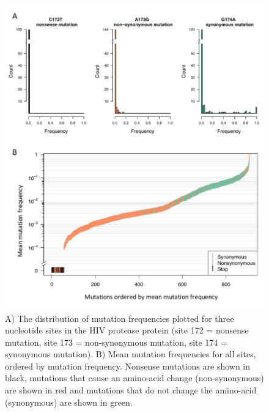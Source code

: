 \documentclass{article}
\begin{document}
\begin{figure}[ht!]
\centering
\includegraphics[scale = .8]{F1-grouped.pdf}
\caption{A) The distribution of mutation frequencies plotted for three nucleotide sites in the HIV protease protein (site 172 = nonsense mutation,  site 173 = non-synonymous mutation, site 174 = synonymous mutation). B) Mean mutation frequencies for all sites, ordered by mutation frequency. 
Nonsense mutations are shown in black, mutations that cause an amino-acid change (non-synonymous) are shown in red and mutations that do not change the amino-acid (synonymous) are shown in green.}
\label{orderedBacheler}
\end{figure}
\end{document}
